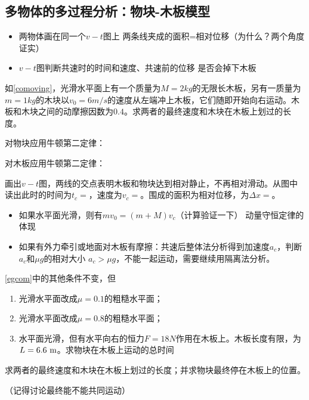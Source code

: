 \documentclass[a4paper,9pt]{ctexart}
\begin{document}
\subsection{多物体的多过程分析：物块-木板模型}
\begin{itemize}
\item
两物体画在同一个$v-t$图上 \so 两条线夹成的面积=相对位移（为什么？两个角度证实）
\item
$v-t$图判断共速时的时间和速度、共速前的位移 \so 是否会掉下木板
\end{itemize}
\begin{eg} \label{egcom}
如\cref{comoving}，光滑水平面上有一个质量为$M = 2\unit{kg}$的无限长木板，另有一质量为$m = 1\unit{kg}$的木块以$v_0 = 6\unit{m/s}$的速度从左端冲上木板，它们随即开始向右运动。木板和木块之间的动摩擦因数为$0.4$。求两者的最终速度和木块在木板上划过的长度。
\end{eg}
\begin{ans}
对物块应用牛顿第二定律：
\par
对木板应用牛顿第二定律：
\par
画出$v-t$图，两线的交点表明木板和物块达到相对静止，不再相对滑动。从图中读出此时的时间为$t_c = $\hspace{2cm}，速度为$v_c =$\hspace{2cm}。围成的面积为相对位移，为$\Delta x =$\hspace{2cm}。
\vspace{4cm}
\end{ans}
\begin{itemize}
\item
如果水平面光滑，则有$mv_0 = (m+M)v_c$（计算验证一下） \so 动量守恒定律的体现

\item
如果有外力牵引或地面对木板有摩擦：共速后整体法分析得到加速度$a_c$，判断$a_c$和$\mu g$的相对大小 \so $a_c>\mu g$，不能一起运动，需要继续用隔离法分析。
\end{itemize}

\begin{eg}
\cref{egcom}中的其他条件不变，但
\begin{enumerate}
\item
光滑水平面改成$\mu = 0.1$的粗糙水平面；
\item
光滑水平面改成$\mu = 0.8$的粗糙水平面；
\item
水平面光滑，但有水平向右的恒力$F = 18\unit{N}$作用在木板上。木板长度有限，为$L = 6.6{\rm \ m}$。求物块在木板上运动的总时间
\end{enumerate}
求两者的最终速度和木块在木板上划过的长度；并求物块最终停在木板上的位置。
\end{eg}
\begin{ans}
（记得讨论最终能不能共同运动）
\vspace{8cm}
\end{ans}
\end{document}
